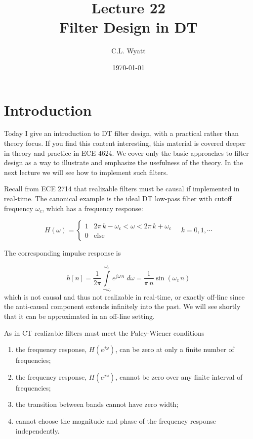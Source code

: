 \documentclass{article}
\begin{document}
\title{Lecture 22\\Filter Design in DT}
\author{C.L. Wyatt}
\date{\today}
\maketitle

\section{Introduction}

Today I give an introduction to DT filter design, with a practical rather than theory focus. If you find this content interesting, this material is covered deeper in theory and practice in ECE 4624. We cover only the basic approaches to filter design as a way to illustrate and emphasize the usefulness of the theory. In the next lecture we will see how to implement such filters.

Recall from ECE 2714 that realizable filters must be causal if implemented in real-time. The canonical example is the ideal DT low-pass filter with cutoff frequency $\omega_c$, which has a frequency response:

\[
H(\omega) = \left\{\begin{array}{cc}
1 & 2\pi\, k-\omega_c < \omega < 2\pi\, k+\omega_c\\
0 & \mbox{else}
\end{array}  \right. \quad k = 0,1,\cdots
\]

The corresponding impulse response is

\[
h[n] = \frac{1}{2\pi} \int\limits_{-\omega_c}^{\omega_c} e^{j\omega\, n}\; d\omega = \frac{1}{\pi\, n} \sin(\omega_c\, n)
\]
which is not causal and thus not realizable in real-time, or exactly off-line since the anti-causal component extends infinitely into the past. We will see shortly that it can be approximated in an off-line setting.

As in CT realizable filters must meet the Paley-Wiener conditions

\begin{enumerate}
\item the frequency response, $H\left(e^{j\omega}\right)$, can be zero at only a finite number of frequencies;
\item the frequency response, $H\left(e^{j\omega}\right)$, cannot be zero over any finite interval of frequencies;
\item the transition between bands cannot have zero width;
\item cannot choose the magnitude and phase of the frequency response independently.
\end{enumerate}
\end{document}
